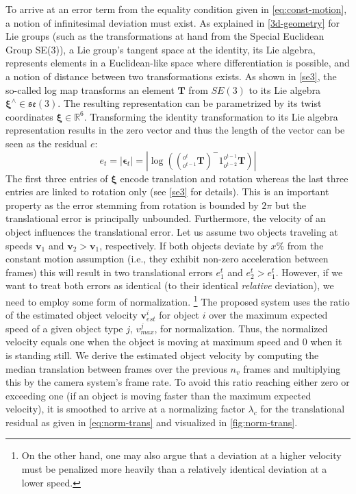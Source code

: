\documentclass[headsepline, hidelinks, footsepline, footinclude=false, oneside, fontsize=11pt, paper=a4, listof=totoc, bibliography=totoc]{scrbook}
\begin{document}
To arrive at an error term from the equality condition given in \cref{eq:const-motion}, a notion of infinitesimal deviation must exist. 
As explained in \cref{3d-geometry} for Lie groups (such as the transformations at hand from the Special Euclidean Group SE(3)), a Lie group's tangent space at the identity, its Lie algebra, represents elements in a Euclidean-like space where differentiation is possible, and a notion of distance between two transformations exists.
As shown in \cref{se3}, the so-called log map transforms an element \(\mathbf{T}\) from \(SE(3)\) to its Lie algebra \(\boldsymbol{\xi}^\wedge \in \mathfrak{se}(3)\).
The resulting representation can be parametrized by its twist coordinates \(\boldsymbol{\xi} \in \mathbb{R}^6\). 
Transforming the identity transformation to its Lie algebra representation results in the zero vector and thus the length of the vector can be seen as the residual \(e\): 
\begin{equation}
e_t = |\boldsymbol{\epsilon}_t| = |\log(({}^{o^{t}}_{o^{t-1}}\mathbf{T})^-1{}^{o^{t-1}}_{o^{t-2}}\mathbf{T})| 
\end{equation}
The first three entries of \(\boldsymbol{\xi}\) encode translation and rotation whereas the last three entries are linked to rotation only (see \cref{se3} for details). 
This is an important property as the error stemming from rotation is bounded by \(2 \pi\) but the translational error is principally unbounded.
Furthermore, the velocity of an object influences the translational error.
Let us assume two objects traveling at speeds \(\mathbf{v}_1\) and \(\mathbf{v}_2 > \mathbf{v}_1\), respectively. 
If both objects deviate by \(x\%\) from the constant motion assumption (i.e., they exhibit non-zero acceleration between frames) this will result in two translational errors \(e^t_1\) and \(e^t_2 > e^t_1\). 
However, if we want to treat both errors as identical (to their identical \emph{relative} deviation), we need to employ some form of normalization.
\footnote{On the other hand, one may also argue that a deviation at a higher velocity must be penalized more heavily than a relatively identical deviation at a lower speed.}
The proposed system uses the ratio of the estimated object velocity \(\mathbf{v}_{est}^i\) for object \(i\) over the maximum expected speed of a given object type \(j\), \(v_{max}^j\), for normalization. 
Thus, the normalized velocity equals one when the object is moving at maximum speed and 0 when it is standing still. 
We derive the estimated object velocity by computing the median translation between frames over the previous \(n_v\) frames and multiplying this by the camera system's frame rate.
To avoid this ratio reaching either zero or exceeding one (if an object is moving faster than the maximum expected velocity), it is smoothed to arrive at a normalizing factor
\(\lambda_c\) for the translational residual as given in \cref{eq:norm-trans} and visualized in \cref{fig:norm-trans}.
\end{document}
